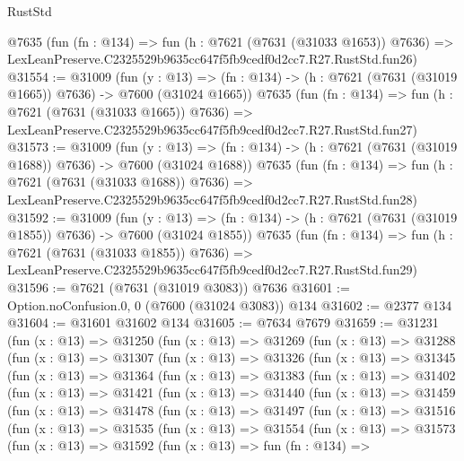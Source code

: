 \begin{lexlean}{RustStd}
\begin{coremodule}
    @7635
    (fun (fn : @134) =>
    fun (h : @7621 (@7631 (@31033 @1653)) @7636) =>
    LexLeanPreserve.C2325529b9635cc647f5fb9cedf0d2cc7.R27.RustStd.fun26)
@31554 := @31009
    (fun (y : @13) =>
    (fn : @134) -> (h : @7621 (@7631 (@31019 @1665)) @7636) -> @7600 (@31024 @1665))
    @7635
    (fun (fn : @134) =>
    fun (h : @7621 (@7631 (@31033 @1665)) @7636) =>
    LexLeanPreserve.C2325529b9635cc647f5fb9cedf0d2cc7.R27.RustStd.fun27)
@31573 := @31009
    (fun (y : @13) =>
    (fn : @134) -> (h : @7621 (@7631 (@31019 @1688)) @7636) -> @7600 (@31024 @1688))
    @7635
    (fun (fn : @134) =>
    fun (h : @7621 (@7631 (@31033 @1688)) @7636) =>
    LexLeanPreserve.C2325529b9635cc647f5fb9cedf0d2cc7.R27.RustStd.fun28)
@31592 := @31009
    (fun (y : @13) =>
    (fn : @134) -> (h : @7621 (@7631 (@31019 @1855)) @7636) -> @7600 (@31024 @1855))
    @7635
    (fun (fn : @134) =>
    fun (h : @7621 (@7631 (@31033 @1855)) @7636) =>
    LexLeanPreserve.C2325529b9635cc647f5fb9cedf0d2cc7.R27.RustStd.fun29)
@31596 := @7621 (@7631 (@31019 @3083)) @7636
@31601 := Option.noConfusion.{0, 0} (@7600 (@31024 @3083)) @134
@31602 := @2377 @134
@31604 := @31601 @31602 @134
@31605 := @7634 @7679
@31659 := @31231
    (fun (x : @13) =>
    @31250
      (fun (x : @13) =>
      @31269
        (fun (x : @13) =>
        @31288
          (fun (x : @13) =>
          @31307
            (fun (x : @13) =>
            @31326
              (fun (x : @13) =>
              @31345
                (fun (x : @13) =>
                @31364
                  (fun (x : @13) =>
                  @31383
                    (fun (x : @13) =>
                    @31402
                      (fun (x : @13) =>
                      @31421
                        (fun (x : @13) =>
                        @31440
                          (fun (x : @13) =>
                          @31459
                            (fun (x : @13) =>
                            @31478
                              (fun (x : @13) =>
                              @31497
                                (fun (x : @13) =>
                                @31516
                                  (fun (x : @13) =>
                                  @31535
                                    (fun (x : @13) =>
                                    @31554
                                      (fun (x : @13) =>
                                      @31573
                                        (fun (x : @13) =>
                                        @31592
                                          (fun (x : @13) =>
                                          fun (fn : @134) =>

\end{coremodule}
\end{lexlean}
